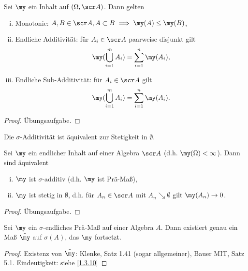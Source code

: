 \begin{nt} \label{1.3.7}
	Sei $\my$ ein Inhalt auf $(\Omega, \scr A)$.
	Dann gelten
	\begin{enumerate}[(i)]
		\item
			Monotonie: $A,B \in \scr A, A \subset B \implies \my(A) \le \my(B)$,
		\item
			Endliche Additivität: für $A_i \in \scr A$ paarweise disjunkt gilt
			\[
				\my(\bigcup_{i=1}^m A_i)
				= \sum_{i=1}^n \my(A_i),
			\]
		\item
			Endliche Sub-Additivität: für $A_i \in \scr A$ gilt
			\[
				\my(\bigcup_{i=1}^m A_i)
				= \sum_{i=1}^n \my(A_i).
			\]
	\end{enumerate}
	\begin{proof}
		Übungsaufgabe.
	\end{proof}
\end{nt}

Die $\sigma$-Additivität ist äquivalent zur Stetigkeit in $\emptyset$.

\begin{lem} \label{1.3.8}
	Sei $\my$ ein endlicher Inhalt auf einer Algebra $\scr A$ (d.h. $\my(\Omega) < \infty$).
	Dann sind äquivalent
	\begin{enumerate}[(i)]
		\item
			$\my$ ist $\sigma$-additiv (d.h. $\my$ ist Prä-Maß),
		\item
			$\my$ ist stetig in $\emptyset$, d.h. für $A_n \in \scr A$ mit $A_n \searrow \emptyset$ gilt $\my(A_n) \to 0$.
	\end{enumerate}
	\begin{proof}
		Übungsaufgabe.
	\end{proof}
\end{lem}


\begin{st}[Caratheodory] \label{1.3.9}
	Sei $\my$ ein $\sigma$-endliches Prä-Maß auf einer Algebra $A$.
	Dann existiert genau ein Maß $\tilde \my$ auf $\sigma(A)$, das $\my$ fortsetzt.
	\begin{proof}
		Existenz von $\tilde \my$: Klenke, Satz 1.41 (sogar allgemeiner), Bauer MIT, Satz 5.1. %
		Eindeutigkeit: siehe \ref{1.3.10}
	\end{proof}
\end{st}

